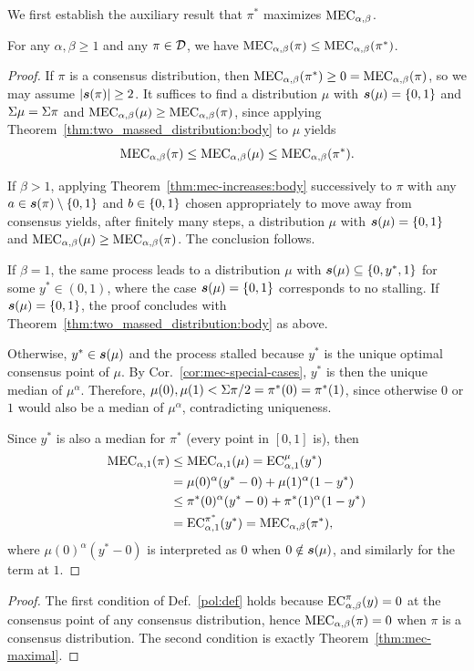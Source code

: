 We first establish the auxiliary result that $\pi^*$ maximizes $\MEC$.

\begin{theorem}\label{thm:mec-maximal}
For any $\alpha,\beta\geq 1$ and any $\pi\in\mathcal{D}$, we have $\MEC(\pi)\le\MEC(\pi^*)$.
\end{theorem}
\begin{proof}
If $\pi$ is a consensus distribution, then $\MEC(\pi^*)\geq 0 = \MEC(\pi)$, so we may assume $|\boldsymbol{s}(\pi)|\geq 2$.
It suffices to find a distribution $\mu$ with $\support(\mu)=\set{0,1}$ and $\Sigma \mu=\Sigma \pi$ and $\MEC(\mu)\geq \MEC(\pi)$, since applying Theorem~\ref{thm:two_massed_distribution:body} to $\mu$ yields
\[
\MEC(\pi)\leq \MEC(\mu) \leq \MEC(\pi^*).
\]

If $\beta>1$, applying Theorem~\ref{thm:mec-increases:body} successively to $\pi$ with any $a\in\boldsymbol{s}(\pi)\setminus\{0,1\}$ and $b\in\set{0,1}$ chosen appropriately to move away from consensus yields, after finitely many steps, a distribution $\mu$ with $\boldsymbol{s}(\mu)=\{0,1\}$ and $\MEC(\mu)\ge\MEC(\pi)$. The conclusion follows.

If $\beta=1$, the same process leads to a distribution $\mu$ with $\support(\mu)\subseteq\set{0,y^*,1}$ for some $y^*\in(0,1)$, where the case $\support(\mu)=\set{0,1}$ corresponds to no stalling. If $\support(\mu)=\set{0,1}$, the proof concludes with Theorem~\ref{thm:two_massed_distribution:body} as above.

Otherwise, $y^*\in\boldsymbol{s}(\mu)$ and the process stalled because $y^*$ is the unique optimal consensus point of $\mu$. By Cor.~\ref{cor:mec-special-cases}, $y^*$ is then the unique median of $\mu^\alpha$. Therefore, $\mu(0),\mu(1)<\Sigma \pi/2=\pi^*(0)=\pi^*(1)$, since otherwise $0$ or $1$ would also be a median of $\mu^\alpha$, contradicting uniqueness.

Since $y^*$ is also a median for $\pi^*$ (every point in $[0,1]$ is), then 
\[
\begin{aligned}
\MEC[\alpha,1](\pi)&\leq \MEC[\alpha,1](\mu)
 = \EC[\alpha,1][\mu](y^*)\\
&= \mu(0)^\alpha (y^*-0) + \mu(1)^\alpha (1-y^*)\\
&\leq \pi^*(0)^\alpha (y^*-0) + \pi^*(1)^\alpha (1-y^*)\\
&=\EC[\alpha,1][\pi^*](y^*)=\MEC(\pi^*),
\end{aligned}
\]
where $\mu(0)^\alpha (y^*-0)$ is interpreted as $0$ when $0\notin\boldsymbol{s}(\mu)$, and similarly for the term at $1$.
\end{proof}

\mecIsPolarization*
\begin{proof}
The first condition of Def.~\ref{pol:def} holds because $\EC(y)=0$ at the consensus point of any consensus distribution, hence $\MEC(\pi)=0$ when $\pi$ is a consensus distribution. The second condition is exactly Theorem~\ref{thm:mec-maximal}.
\end{proof}


